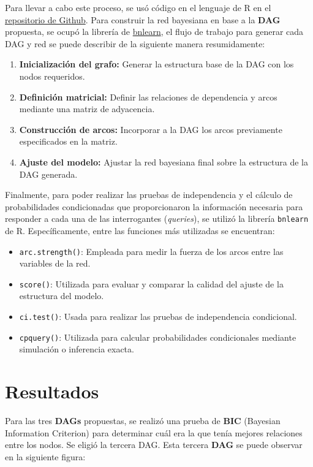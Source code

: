\documentclass[12pt,a4paper]{article}
\begin{document}
Para llevar a cabo este proceso, se usó código en el lenguaje de R en el \href{https://github.com/KibaSpark/bayesian-networks-enmt}{repositorio de Github}. Para construir la red bayesiana en base a la \textbf{DAG} propuesta, se ocupó la librería de \href{https://www.bnlearn.com/}{bnlearn}, el flujo de trabajo para generar cada DAG y red se puede describir de la siguiente manera resumidamente:


\begin{enumerate}
    \item \textbf{Inicialización del grafo:} Generar la estructura base de la DAG con los nodos requeridos.
    \item \textbf{Definición matricial:} Definir las relaciones de dependencia y arcos mediante una matriz de adyacencia.
    \item \textbf{Construcción de arcos:} Incorporar a la DAG los arcos previamente especificados en la matriz.
    \item \textbf{Ajuste del modelo:} Ajustar la red bayesiana final sobre la estructura de la DAG generada.
\end{enumerate}

Finalmente, para poder realizar las pruebas de independencia y el cálculo de probabilidades condicionadas que proporcionaron la información necesaria para responder a cada una de las interrogantes (\textit{queries}), se utilizó la librería \texttt{bnlearn} de R. Específicamente, entre las funciones más utilizadas se encuentran:

\begin{itemize}
    \item \texttt{arc.strength()}: Empleada para medir la fuerza de los arcos entre las variables de la red.
    \item \texttt{score()}: Utilizada para evaluar y comparar la calidad del ajuste de la estructura del modelo.
    \item \texttt{ci.test()}: Usada para realizar las pruebas de independencia condicional.
    \item \texttt{cpquery()}: Utilizada para calcular probabilidades condicionales mediante simulación o inferencia exacta.
\end{itemize}


\section{Resultados} 
Para las tres \textbf{DAGs} propuestas, se realizó una prueba de \textbf{BIC} (Bayesian Information Criterion) para determinar cuál era la que tenía mejores relaciones entre los nodos. Se eligió la tercera DAG. Esta tercera \textbf{DAG} se puede observar en la siguiente figura: 
\end{document}
